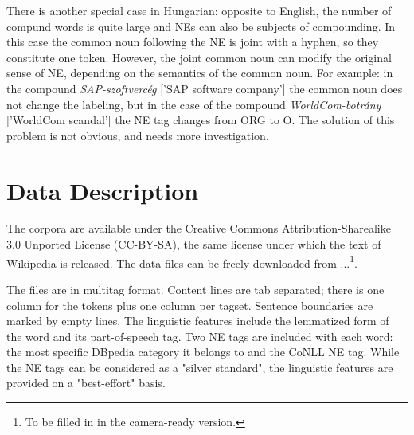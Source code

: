 \documentclass[11pt]{article}
\begin{document}

There is another special case in Hungarian: opposite to English, the number of compund words is quite large and NEs can also be subjects of compounding. In this case the common noun following the NE is joint with a hyphen, so they constitute one token. However, the joint common noun can modify the original sense of NE, depending on the semantics of the common noun. For example: in the compound \textit{SAP-szoftvercég} ['SAP software company'] the common noun does not change the labeling, but in the case of the compound \textit{WorldCom-botrány} ['WorldCom scandal'] the NE tag changes from ORG to O. The solution of this problem is not obvious, and needs more investigation.


\section{Data Description}
\label{sec:data}

The corpora are available under the Creative Commons Attribution-Sharealike 3.0 Unported License (CC-BY-SA), the same license under which the text of Wikipedia is released. The data files can be freely downloaded from ...\footnote{To be filled in in the camera-ready version.}.

The files are in multitag format. Content lines are tab separated; there is one column for the tokens plus one column per tagset. Sentence boundaries are marked by empty lines. The linguistic features include the lemmatized form of the word and its part-of-speech tag. Two NE tags are included with each word: the most specific DBpedia category it belongs to and the CoNLL NE tag. While the NE tags can be considered as a "silver standard", the linguistic features are provided on a "best-effort" basis.
\end{document}
